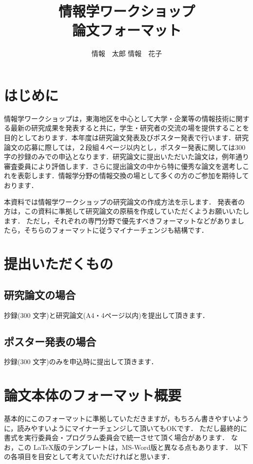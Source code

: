 \documentclass[a4j,8pt,twocolumn]{extarticle}
\title{情報学ワークショップ\\論文フォーマット}
\author{情報　太郎 \qquad 情報　花子}
\affiliation{情報大学情報学部}
\begin{document}
	
\maketitle
\thispagestyle{empty}	%

\section{はじめに}

情報学ワークショップは，東海地区を中心として大学・企業等の情報技術に関する最新の研究成果を発表すると共に，学生・研究者の交流の場を提供することを目的としております．本年度は研究論文発表及びポスター発表で行います．研究論文の応募に際しては，２段組４ページ以内とし，ポスター発表に関しては300字の抄録のみでの申込となります．研究論文に提出いただいた論文は，例年通り審査委員により評価します．さらに提出論文の中から特に優秀な論文を選考しこれを表彰します．情報学分野の情報交換の場として多くの方のご参加を期待しております．

本資料では情報学ワークショップの研究論文の作成方法を示します．
発表者の方は，この資料に準拠して研究論文の原稿を作成していただくようお願いいたします．
ただし，それぞれの専門分野で優先すべきフォーマットなどがありましたら，そちらのフォーマットに従うマイナーチェンジも結構です．


\section{提出いただくもの}
\subsection{研究論文の場合}
抄録(300 文字)と研究論文(A4・4ページ以内)を提出して頂きます．

\subsection{ポスター発表の場合}
抄録(300 文字)のみを申込時に提出して頂きます．

\section{論文本体のフォーマット概要}

基本的にこのフォーマットに準拠していただきますが，もちろん書きやすいように，読みやすいようにマイナーチェンジして頂いてもOKです．
ただし最終的に書式を実行委員会・プログラム委員会で統一させて頂く場合があります．
なお，この \LaTeX 版のテンプレートは，MS-Word版と異なる点もあります．
以下の各項目を目安として考えていただければと思います．
\end{document}
